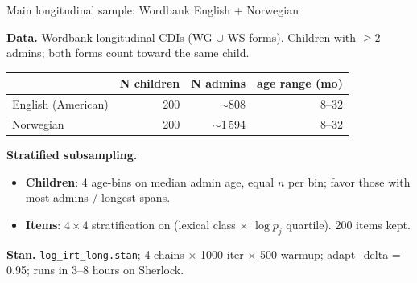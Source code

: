 \documentclass[aspectratio=169,t]{beamer}
\begin{document}
\begin{frame}{Main longitudinal sample: Wordbank English + Norwegian}

\textbf{Data.} Wordbank longitudinal CDIs (WG $\cup$ WS forms).
Children with $\ge 2$ admins; both forms count toward the same child.

\vspace{0.6em}
\begin{tabular}{lrrr}
\toprule
 & N children & N admins & age range (mo) \\
\midrule
English (American) & 200 & $\sim$808 & 8--32 \\
Norwegian          & 200 & $\sim$1\,594 & 8--32 \\
\bottomrule
\end{tabular}

\vspace{1em}
\textbf{Stratified subsampling.}
\begin{itemize}
\item \textbf{Children}: 4 age-bins on median admin age, equal $n$ per
  bin; favor those with most admins / longest spans.
\item \textbf{Items}: $4 \times 4$ stratification on (lexical class
  $\times$ $\log p_j$ quartile). 200 items kept.
\end{itemize}

\vspace{0.5em}
\textbf{Stan.} \texttt{log\_irt\_long.stan}; 4 chains $\times$ 1000
iter $\times$ 500 warmup; adapt\_delta = 0.95; runs in 3--8 hours
on Sherlock.

\end{frame}
\end{document}
